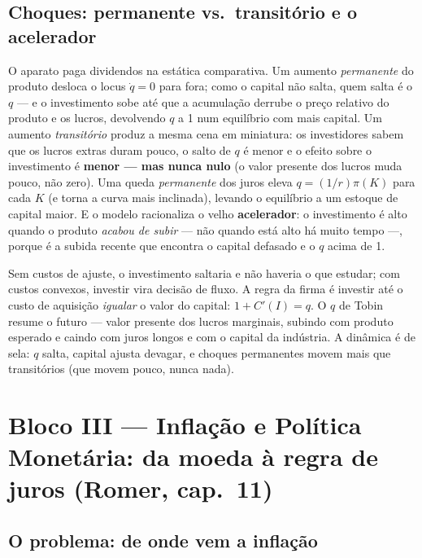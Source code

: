 \documentclass[12pt, a4paper]{article}
\begin{document}
\subsection{Choques: permanente vs.\ transitório e o acelerador}

O aparato paga dividendos na estática comparativa. Um aumento
\emph{permanente} do produto desloca o locus $\dot q = 0$ para fora; como o
capital não salta, quem salta é o $q$ --- e o investimento sobe até que a
acumulação derrube o preço relativo do produto e os lucros, devolvendo $q$ a
1 num equilíbrio com mais capital. Um aumento \emph{transitório} produz a
mesma cena em miniatura: os investidores sabem que os lucros extras duram
pouco, o salto de $q$ é menor e o efeito sobre o investimento é
\textbf{menor --- mas nunca nulo} (o valor presente dos lucros muda pouco,
não zero). Uma queda \emph{permanente} dos juros eleva $q = (1/r)\pi(K)$ para
cada $K$ (e torna a curva mais inclinada), levando o equilíbrio a um estoque
de capital maior. E o modelo racionaliza o velho \textbf{acelerador}: o
investimento é alto quando o produto \emph{acabou de subir} --- não quando
está alto há muito tempo ---, porque é a subida recente que encontra o capital
defasado e o $q$ acima de 1.

\begin{sintesebox}[title={Síntese do Bloco II --- a história em quatro frases}]
Sem custos de ajuste, o investimento saltaria e não haveria o que estudar; com
custos convexos, investir vira decisão de fluxo. A regra da firma é investir
até o custo de aquisição \emph{igualar} o valor do capital: $1+C'(I)=q$. O $q$
de Tobin resume o futuro --- valor presente dos lucros marginais, subindo com
produto esperado e caindo com juros longos e com o capital da indústria. A
dinâmica é de sela: $q$ salta, capital ajusta devagar, e choques permanentes
movem mais que transitórios (que movem pouco, nunca nada).
\end{sintesebox}

\section{Bloco III --- Inflação e Política Monetária: da moeda à regra de juros (Romer, cap.\ 11)}

\subsection{O problema: de onde vem a inflação}
\end{document}
